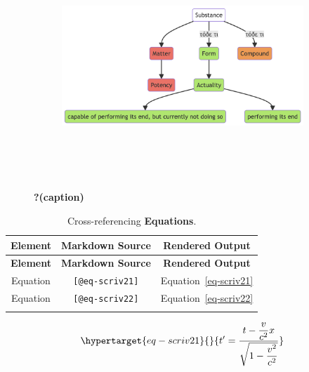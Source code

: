 \documentclass[
  12pt,
  a4paper,
  oneside,
  titlepage,
  toclink=all,
  toc=bibliography]{scrbook}
\theoremstyle{definition}
\theoremstyle{plain}
\theoremstyle{plain}
\theoremstyle{plain}
\theoremstyle{plain}
\theoremstyle{definition}
\theoremstyle{definition}
\theoremstyle{plain}
\theoremstyle{remark}
\begin{document}
\begin{figure}

{\centering 

\begin{figure}[H]

{\centering \includegraphics[width=6.65in,height=3.32in]{index_files/figure-latex/mermaid-figure-3.png}

}

\end{figure}

}

\caption{\label{fig-scriv19}\textbf{?(caption)}}

\end{figure}

\hypertarget{tbl-scriv20}{}
\begin{longtable}[]{@{}ccc@{}}
\toprule\noalign{}
\textbf{Element} & \textbf{Markdown Source} & \textbf{Rendered
Output} \\
\midrule\noalign{}
\endfirsthead
\toprule\noalign{}
\textbf{Element} & \textbf{Markdown Source} & \textbf{Rendered
Output} \\
\midrule\noalign{}
\endhead
\bottomrule\noalign{}
\endlastfoot
Equation & \texttt{{[}@eq-scriv21{]}} &
\protect\hypertarget{cite_56}{}{\label{cite_56}Equation~\ref{eq-scriv21}} \\
Equation & \texttt{{[}@eq-scriv22{]}} &
\protect\hypertarget{cite_57}{}{\label{cite_57}Equation~\ref{eq-scriv22}} \\
\caption{\label{tbl-scriv20}Cross-referencing
\textbf{Equations}.}\tabularnewline
\end{longtable}

\begin{equation}\protect\hypertarget{eq-scriv21}{}{t' = \frac{t - \dfrac{v}{c^{2}}x}{\sqrt{1 - \dfrac{v^{2}}{c^{2}}}}}\label{eq-scriv21}\end{equation}
\end{document}
